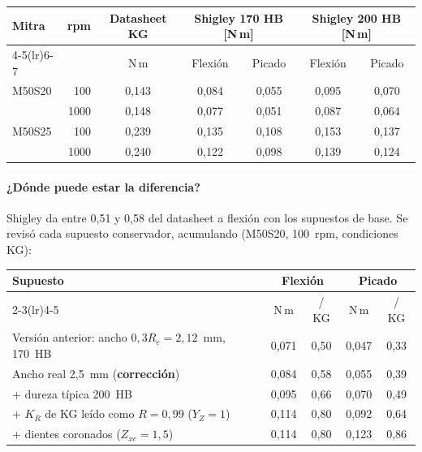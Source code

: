 \documentclass[11pt,a4paper]{article}
\begin{document}
\begin{table}[H]\centering\small\setlength{\tabcolsep}{5pt}
\begin{tabular}{l r c cc cc}
\toprule
Mitra & rpm & Datasheet KG & \multicolumn{2}{c}{Shigley 170 HB [N\,m]} & \multicolumn{2}{c}{Shigley 200 HB [N\,m]}\\
\cmidrule(lr){4-5}\cmidrule(lr){6-7}
 & & N\,m & Flexión & Picado & Flexión & Picado\\
\midrule
M50S20 & 100  & 0,143 & 0,084 & 0,055 & 0,095 & 0,070\\
       & 1000 & 0,148 & 0,077 & 0,051 & 0,087 & 0,064\\
M50S25 & 100  & 0,239 & 0,135 & 0,108 & 0,153 & 0,137\\
       & 1000 & 0,240 & 0,122 & 0,098 & 0,139 & 0,124\\
\bottomrule
\end{tabular}
\end{table}

\paragraph{¿Dónde puede estar la diferencia?} Shigley da entre 0,51 y 0,58 del datasheet a flexión con los supuestos
de base. Se revisó cada supuesto conservador, acumulando (M50S20, 100~rpm, condiciones KG):

\begin{table}[H]\centering\small\setlength{\tabcolsep}{5pt}
\begin{tabular}{l cc cc}
\toprule
Supuesto & \multicolumn{2}{c}{Flexión} & \multicolumn{2}{c}{Picado}\\
\cmidrule(lr){2-3}\cmidrule(lr){4-5}
 & N\,m & / KG & N\,m & / KG\\
\midrule
Versión anterior: ancho $0{,}3R_e=2{,}12$~mm, 170~HB & 0,071 & 0,50 & 0,047 & 0,33\\
Ancho real 2,5~mm (\textbf{corrección}) & 0,084 & 0,58 & 0,055 & 0,39\\
+ dureza típica 200~HB & 0,095 & 0,66 & 0,070 & 0,49\\
+ $K_R$ de KG leído como $R=0{,}99$ ($Y_Z=1$) & 0,114 & 0,80 & 0,092 & 0,64\\
+ dientes coronados ($Z_{xc}=1{,}5$) & 0,114 & 0,80 & 0,123 & 0,86\\
\bottomrule
\end{tabular}
\end{table}
\end{document}
